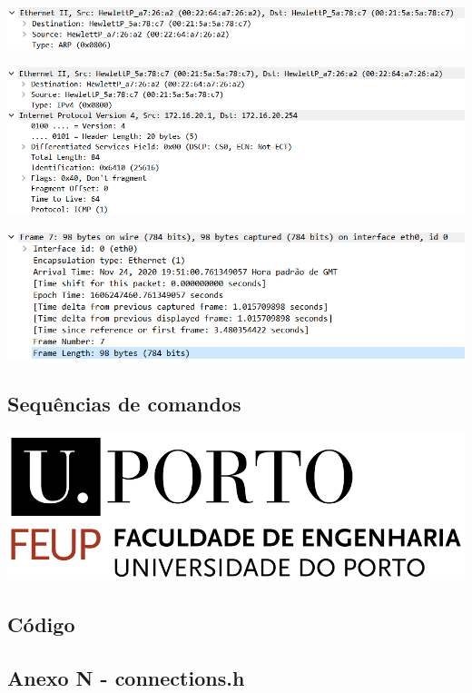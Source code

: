 \documentclass[11pt]{article}
\begin{document}
\includegraphics[width=\textwidth]{figura5.PNG}

\includegraphics[width=\textwidth]{figura6.PNG}

\includegraphics[width=\textwidth]{figura7.PNG}

\subsection{Sequências de comandos}

\includegraphics[width=\textwidth]{feup_logo.png}

\pagebreak

\subsection{Código}

\subsection{ Anexo N - connections.h}
\end{document}
